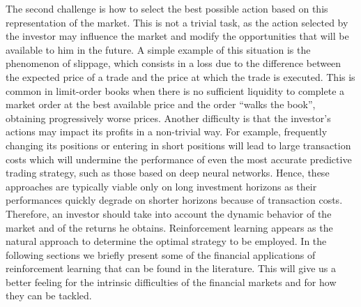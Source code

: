 The second challenge is how to select the best possible action based on this representation of the market. This is not a trivial task, as the action selected by the investor may influence the market and modify the opportunities that will be available to him in the future. A simple example of this situation is the phenomenon of slippage, which consists in a loss due to the difference between the expected price of a trade and the price at which the trade is executed. This is common in limit-order books when there is no sufficient liquidity to complete a market order at the best available price and the order ``walks the book'', obtaining progressively worse prices. Another difficulty is that the investor's actions may impact its profits in a non-trivial way. For example, frequently changing its positions or entering in short positions will lead to large transaction costs which will undermine the performance of even the most accurate predictive trading strategy, such as those based on deep neural networks. Hence, these approaches are typically viable only on long investment horizons as their performances quickly degrade on shorter horizons because of transaction costs. Therefore, an investor should take into account the dynamic behavior of the market and of the returns he obtains. Reinforcement learning appears as the natural approach to determine the optimal strategy to be employed. In the following sections we briefly present some of the financial applications of reinforcement learning that can be found in the literature. This will give us a better feeling for the intrinsic difficulties of the financial markets and for how they can be tackled. 


